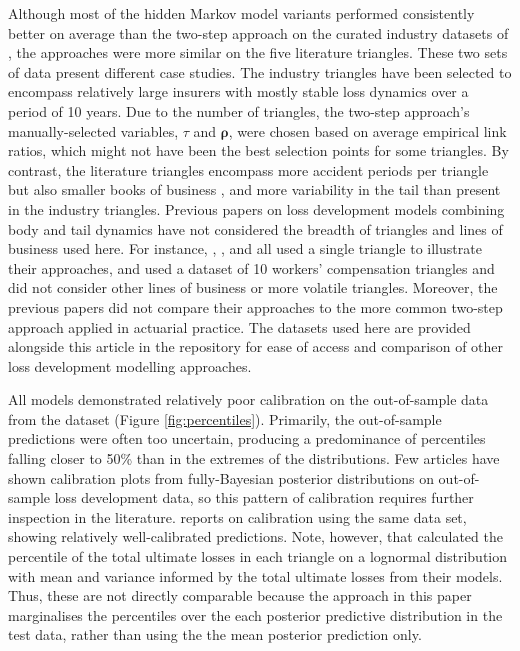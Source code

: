 Although most of the hidden Markov model variants
performed consistently better on average
than the two-step
approach on the curated industry datasets
of \cite{meyers2015}, the approaches were
more similar on the five literature triangles.
These two sets of data present different
case studies. The industry triangles
have been selected to encompass relatively
large insurers with mostly stable
loss dynamics \citep[see][appendix A]{meyers2015}
over a period of 10 years.
Due to the number of triangles, the two-step
approach's manually-selected variables,
$\tau$ and $\bm{\rho}$,
were chosen based on average empirical link
ratios, which might not have been the best
selection points for some triangles.
By contrast, the literature triangles encompass
more accident periods per triangle but also smaller
books of business \citep[e.g. the medium-sized
triangles from][]{balona2022}, and
more variability in the tail than 
present in the industry triangles.
Previous papers on loss development models
combining body and tail dynamics
have not considered the breadth of triangles
and lines of business used here. For instance,
\cite{englandverrall2001}, \cite{verrall2012},
and \cite{verrall2015} all
used a single triangle to illustrate their approaches,
and 
\cite{zhang2012} used a dataset of
10 workers' compensation triangles and
did not consider other lines of business or
more volatile triangles. Moreover,
the previous papers did not compare
their approaches to the more common
two-step approach applied in actuarial
practice.
The datasets used here are provided alongside
this article in the repository
for ease of access
and comparison of other loss development
modelling approaches.

All models demonstrated relatively poor
calibration on the out-of-sample
data from the \cite{meyers2015}
dataset (Figure \ref{fig:percentiles}). 
Primarily, 
the out-of-sample
predictions were often too
uncertain, producing a
predominance of percentiles falling
closer to 50\% than in the extremes
of the distributions.
Few articles have shown calibration
plots from fully-Bayesian posterior
distributions on out-of-sample
loss development data, so this pattern of calibration requires
further inspection in the literature.
\cite{meyers2015} reports on 
calibration using the same data set,
showing relatively well-calibrated
predictions. Note, however, 
that \cite{meyers2015} calculated
the percentile of the total ultimate
losses in each triangle on a lognormal
distribution with mean and variance
informed by the total ultimate losses
from their models. Thus, these
are not directly comparable because
the approach in this paper marginalises the percentiles
over the each posterior predictive distribution
in the test data, rather than using the
the mean posterior prediction only.

